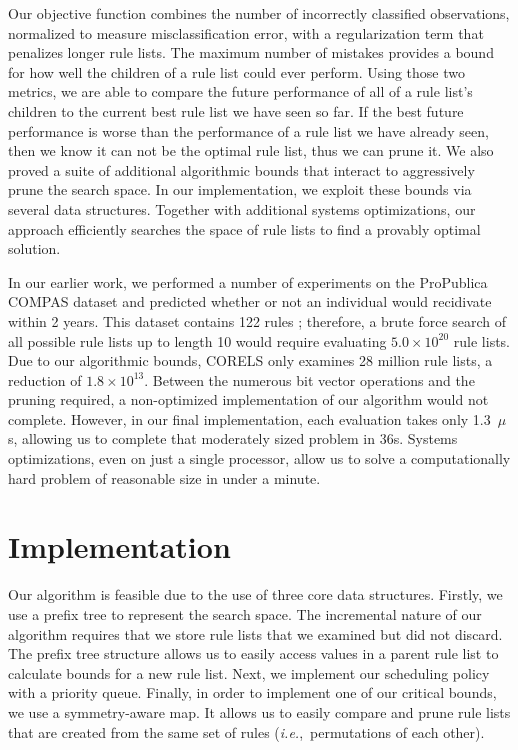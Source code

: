 \documentclass[format=sigconf]{acmart}
\def\ie{{\it i.e.},~}
\begin{document}
Our objective function combines the number of incorrectly classified observations, normalized to measure misclassification error, with a regularization term that penalizes longer rule lists.
The maximum number of mistakes provides a bound for how well the children of a rule list could ever perform.
Using those two metrics, we are able to compare the future performance of all of a rule list's children to the current best rule list we have seen so far.
If the best future performance is worse than the performance of a rule list we have already seen, then we know it can not be the optimal rule list, thus we can prune it.
We also proved a suite of additional algorithmic bounds that interact to aggressively prune the search space.
In our implementation, we exploit these bounds via several data structures.  
Together with additional systems optimizations, our approach efficiently searches the space of rule lists to find a provably optimal solution.

In our earlier work, we performed a number of experiments on the ProPublica COMPAS dataset \cite{LarsonMaKiAn16} and predicted whether or not an individual would recidivate within 2 years.
This dataset contains 122 rules ; therefore, a brute force search of all possible rule lists up to length 10 would require evaluating ${5.0 \times 10^{20}}$ rule lists.
Due to our algorithmic bounds, CORELS only examines 28 million rule lists, a reduction of ${1.8 \times 10^{13}}$.
Between the numerous bit vector operations and the pruning required, a non-optimized implementation of our algorithm would not complete.
However, in our final implementation, each evaluation takes only 1.3~$\mu$s, allowing us to complete that moderately sized problem in 36s.
Systems optimizations, even on just a single processor, allow us to solve a computationally hard problem of reasonable size in under a minute.

\section{Implementation}
Our algorithm is feasible due to the use of three core data structures.
Firstly, we use a prefix tree to represent the search space.
The incremental nature of our algorithm requires that we store rule lists that we examined but did not discard.
The prefix tree structure allows us to easily access values in a parent rule list to calculate bounds for a new rule list.
Next, we implement our scheduling policy with a priority queue.
Finally, in order to implement one of our critical bounds, we use a symmetry-aware map.
It allows us to easily compare and prune rule lists that are created from the same set of rules (\ie permutations of each other).
\end{document}
